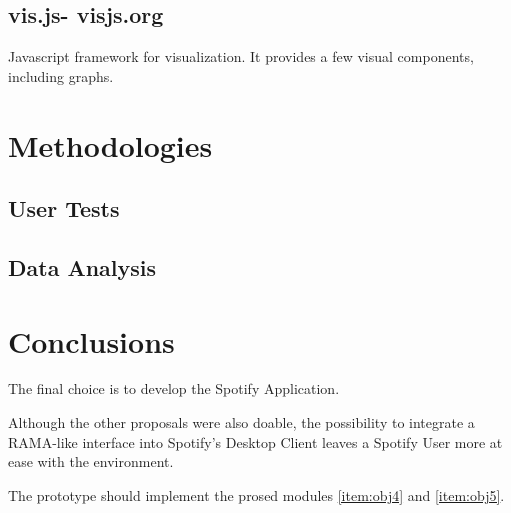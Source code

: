 
  \subsection{vis.js- visjs.org} %
  \label{sub:visjs}
    Javascript framework for visualization.
    It provides a few visual components, including graphs.

\section{Methodologies} %
\label{sec:methodologies}


  \subsection{User Tests} %
  \label{sub:user_tests}
  

  \subsection{Data Analysis} %
  \label{sub:data_analysis}
  

\section{Conclusions}

  The final choice is to develop the Spotify Application.

  Although the other proposals were also doable, the possibility to integrate a RAMA-like interface into Spotify's Desktop Client leaves a Spotify User more at ease with the environment.

  The prototype should implement the prosed modules \ref{item:obj4} and \ref{item:obj5}.